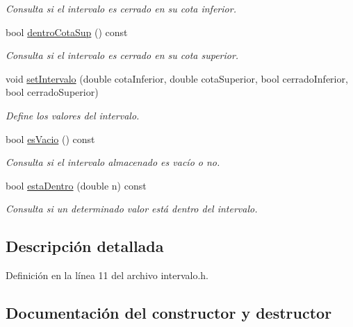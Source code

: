 \begin{DoxyCompactItemize}
\begin{DoxyCompactList}\small\item\em Consulta si el intervalo es cerrado en su cota inferior. \end{DoxyCompactList}\item 
bool \hyperlink{classIntervalo_aed0964a68d4b727bd104f5128ee7a7ef}{dentro\+Cota\+Sup} () const
\begin{DoxyCompactList}\small\item\em Consulta si el intervalo es cerrado en su cota superior. \end{DoxyCompactList}\item 
void \hyperlink{classIntervalo_a3e7cfa7c148a4e60be7040fecf506313}{set\+Intervalo} (double cota\+Inferior, double cota\+Superior, bool cerrado\+Inferior, bool cerrado\+Superior)
\begin{DoxyCompactList}\small\item\em Define los valores del intervalo. \end{DoxyCompactList}\item 
bool \hyperlink{classIntervalo_adc77e18147f9f9f85476a0d44257bb02}{es\+Vacio} () const
\begin{DoxyCompactList}\small\item\em Consulta si el intervalo almacenado es vacío o no. \end{DoxyCompactList}\item 
bool \hyperlink{classIntervalo_a2cccd9264f1b3912c6006fe3e2a70289}{esta\+Dentro} (double n) const
\begin{DoxyCompactList}\small\item\em Consulta si un determinado valor está dentro del intervalo. \end{DoxyCompactList}\end{DoxyCompactItemize}


\subsection{Descripción detallada}


Definición en la línea 11 del archivo intervalo.\+h.



\subsection{Documentación del constructor y destructor}
\mbox{\label{classIntervalo_a9b5b23dda7ee26b444898457959cb03d}} 
